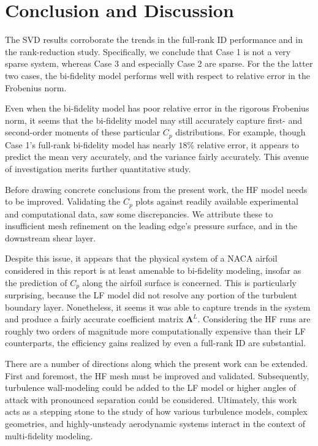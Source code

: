 \documentclass[11pt]{article}
\begin{document}
\section{Conclusion and Discussion}

The SVD results corroborate the trends in the full-rank ID performance and in the rank-reduction study. Specifically, we conclude that Case 1 is not a very sparse system, whereas Case 3 and especially Case 2 are sparse. For the the latter two cases, the bi-fidelity model performs well with respect to relative error in the Frobenius norm.

Even when the bi-fidelity model has poor relative error in the rigorous Frobenius norm, it seems that the bi-fidelity model may still accurately capture first- and second-order moments of these particular $C_p$ distributions. For example, though Case 1's full-rank bi-fidelity model has nearly $18\%$ relative error, it appears to predict the mean very accurately, and the variance fairly accurately. This avenue of investigation merits further quantitative study.

Before drawing concrete conclusions from the present work, the HF model needs to be improved. Validating the $C_p$ plots against readily available experimental and computational data, saw some discrepancies. We attribute these to insufficient mesh refinement on the leading edge's pressure surface, and in the downstream shear layer.

Despite this issue, it appears that the physical system of a NACA airfoil considered in this report is at least amenable to bi-fidelity modeling, insofar as the prediction of $C_p$ along the airfoil surface is concerned. This is particularly surprising, because the LF model did not resolve any portion of the turbulent boundary layer. Nonetheless, it seems it was able to capture trends in the system and produce a fairly accurate coefficient matrix $\bm{\Lambda}^L$. Considering the HF runs are roughly two orders of magnitude more computationally expensive than their LF counterparts, the efficiency gains realized by even a full-rank ID are substantial.

There are a number of directions along which the present work can be extended. First and foremost, the HF mesh must be improved and validated. Subsequently, turbulence wall-modeling could be added to the LF model or higher angles of attack with pronounced separation could be considered. Ultimately, this work acts as a stepping stone to the study of how various turbulence models, complex geometries, and highly-unsteady aerodynamic systems interact in the context of multi-fidelity modeling.
\end{document}
